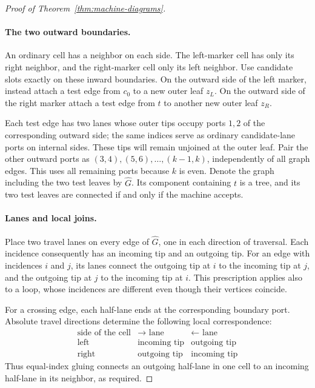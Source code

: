 \begin{proof}[Proof of Theorem~\ref{thm:machine-diagrams}]
\paragraph{The two outward boundaries.}
An ordinary cell has a neighbor on each side.  The left-marker
cell has only its right neighbor, and the right-marker cell only
its left neighbor.  Use candidate slots exactly on these inward
boundaries.  On the outward side of the left marker, instead
attach a test edge from $c_0$ to a new outer leaf $z_L$.  On the
outward side of the right marker attach a test edge from $t$ to
another new outer leaf $z_R$.

Each test edge has two lanes whose outer tips occupy ports $1,2$
of the corresponding outward side; the same indices serve as ordinary
candidate-lane ports on internal sides.  These tips will remain
unjoined at the outer leaf.  Pair the other outward ports as
$(3,4),(5,6),\ldots,(k-1,k)$, independently of all graph edges.
This uses all remaining ports because $k$ is even.  Denote the
graph including the two test leaves by $\widehat G$.  Its component
containing $t$ is a tree, and its two test leaves are connected if
and only if the machine accepts.

\paragraph{Lanes and local joins.}
Place two travel lanes on every edge of $\widehat G$, one in each
direction of traversal.  Each incidence consequently has an
incoming tip and an outgoing tip.  For an edge with incidences
$i$ and $j$, its lanes connect the outgoing tip at $i$ to the
incoming tip at $j$, and the outgoing tip at $j$ to the incoming
tip at $i$.  This prescription applies also to a loop, whose
incidences are different even though their vertices coincide.

For a crossing edge, each half-lane ends at the corresponding
boundary port.  Absolute travel directions determine the following
local correspondence:
\[
\begin{array}{c|cc}
 \text{side of the cell}&\rightarrow\text{ lane}&\leftarrow\text{ lane}\\
 \hline
 \text{left}&\text{incoming tip}&\text{outgoing tip}\\
 \text{right}&\text{outgoing tip}&\text{incoming tip}
\end{array}
\]
Thus equal-index gluing connects an outgoing half-lane in one
cell to an incoming half-lane in its neighbor, as required.


\end{proof}
